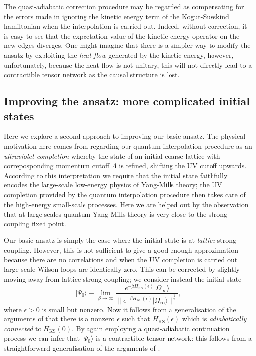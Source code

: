 \documentclass[twocolumn,lengthcheck,superscriptaddress]{revtex4-1}
\theoremstyle{definition}
\theoremstyle{remark}
\begin{document}
The quasi-adiabatic correction procedure may be regarded as compensating for the errors made in ignoring the kinetic energy term of the Kogut-Susskind hamiltonian when the interpolation is carried out. Indeed, without correction, it is easy to see that the expectation value of the kinetic energy operator on the new edges diverges. One might imagine that there is a simpler way to modify the ansatz by exploiting the \emph{heat flow} generated by the kinetic energy, however, unfortunately, because the heat flow is not unitary, this will not directly lead to a contractible tensor network as the causal structure is lost. 

\subsection{Improving the ansatz: more complicated initial states}
Here we explore a second approach to improving our basic ansatz. The physical motivation here comes from regarding our quantum interpolation procedure as an \emph{ultraviolet completion} whereby the state of an initial coarse lattice with correposponding momentum cutoff $\Lambda$ is refined, shifting the UV cutoff upwards. According to this interpretation we require that the initial state faithfully encodes the large-scale low-energy physics of Yang-Mills theory; the UV completion provided by the quantum interpolation procedure then takes care of the high-energy small-scale processes. Here we are helped out by the observation that at large scales quantum Yang-Mills theory is very close to the strong-coupling fixed point. 

Our basic ansatz is simply the case where the initial state is at \emph{lattice} strong coupling. However, this is not sufficient to give a good enough approximation because there are no correlations and when the UV completion is carried out large-scale Wilson loops are identically zero. This can be corrected by slightly moving away from lattice strong coupling; we consider instead the initial state
\begin{equation}
	|\Psi_0\rangle \equiv \lim_{\beta\rightarrow\infty} \frac{e^{-\beta H_{\text{KS}}(\epsilon)}|\Omega_\infty\rangle}{\|e^{-\beta H_{\text{KS}}(\epsilon)}|\Omega_\infty\rangle\|^{\frac12}},
\end{equation}    
where $\epsilon > 0$ is small but nonzero. Now it follows from a generalisation of the arguments of \cite{bravyi:2010c,michalakis:2013a} that there is a nonzero $\epsilon$ such that $H_{\text{KS}}(\epsilon)$ which is \emph{adiabatically connected} to $H_{\text{KS}}(0)$. By again employing a quasi-adiabatic continuation process we can infer that $|\Psi_0\rangle$ is a contractible tensor network: this follows from a straightforward generalisation of the arguments of \cite{osborne:2006a,wen:2005a}. 
\end{document}
